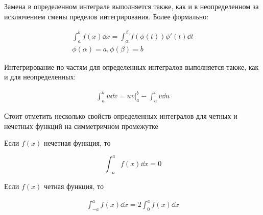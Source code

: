 
Замена в определенном интеграле выполняется также, как и в неопределенном за
исключением смены пределов интегрирования. Более формально:

\begin{align*}
  \int_{a}^{b} f(x) \dd x = \int_{\alpha}^{\beta} f(\phi(t)) \phi'(t) \dd t \\
  \phi(\alpha) = a, \phi(\beta) = b
\end{align*}

Интегрирование по частям для определенных интегралов выполняется также, как и
для неопределенных:

\begin{align*}
  \int_{a}^{b} u \dd v = u v \bigg\vert_{a}^{b} - \int_{a}^{b} v \dd u
\end{align*}

Стоит отметить несколько свойств определенных интегралов для четных и нечетных
функций на симметричном промежутке

\begin{multicols}{2}
  \begin{lemma}
    Если \(f(x)\) нечетная функция, то

    \begin{equation*}
      \int_{-a}^{a} f(x) \dd x = 0
    \end{equation*}
  \end{lemma}
  
  \begin{lemma}
    Если \(f(x)\) четная функция, то
    
    \begin{align*}
      \int_{-a}^{a} f(x) \dd x = 2 \int_{0}^{a} f(x) \dd x
    \end{align*}
  \end{lemma}  
\end{multicols}

